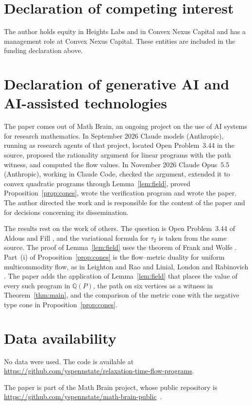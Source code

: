 \documentclass[11pt]{amsart}
\theoremstyle{remark}
\numberwithin{equation}{section}
\newcommand{\Q}{\mathbb Q}
\begin{document}
\section*{Declaration of competing interest}
The author holds equity in Heights Labs and in Convex Nexus Capital and
has a management role at Convex Nexus Capital. These entities are included
in the funding declaration above.

\section*{Declaration of generative AI and AI-assisted technologies}
The paper comes out of Math Brain, an ongoing project on the use of AI systems for research mathematics. In September 2026 Claude models (Anthropic), running as research agents of that project, located Open Problem~3.44 in the source, proposed the rationality argument for linear programs with the path witness, and computed the flow values. In November 2026 Claude Opus~5.5 (Anthropic), working in Claude Code, checked the argument, extended it to convex quadratic programs through Lemma~\ref{lem:field}, proved Proposition~\ref{prop:cones}, wrote the verification program and wrote the paper. The author directed the work and is responsible for the content of the paper and for decisions concerning its dissemination.

The results rest on the work of others. The question is Open Problem~3.44 of Aldous and Fill \cite{AF}, and the variational formula for $\tau_2$ is taken from the same source. The proof of Lemma~\ref{lem:field} uses the theorem of Frank and Wolfe \cite{FW}. Part~(i) of Proposition~\ref{prop:cones} is the flow--metric duality for uniform multicommodity flow, as in Leighton and Rao \cite{LR} and Linial, London and Rabinovich \cite{LLR}. The paper adds the application of Lemma~\ref{lem:field} that places the value of every such program in $\Q(P)$, the path on six vertices as a witness in Theorem~\ref{thm:main}, and the comparison of the metric cone with the negative type cone in Proposition~\ref{prop:cones}.

\section*{Data availability}
No data were used. The code is available at\\ \url{https://github.com/yspennstate/relaxation-time-flow-programs}.

The paper is part of the Math Brain project, whose public repository is \url{https://github.com/yspennstate/math-brain-public}~\cite{MathBrainRepo}.
\end{document}
